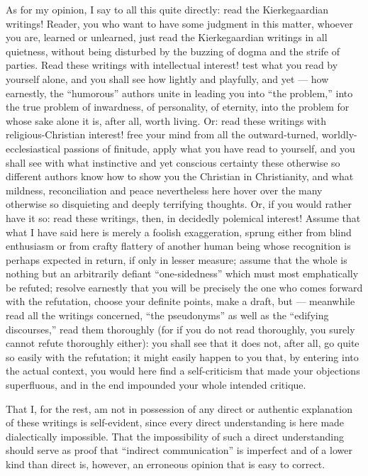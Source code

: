 \documentclass[12pt,a4paper,openany]{book}
\newcommand{\opage}[1]{\marginnote{\footnotesize\textit{[#1]}}}
\begin{document}
As for my opinion, I say to all this
quite directly: read the Kierkegaardian writings! Reader, you
who want to have some judgment in this matter, whoever you are,
learned or unlearned, just read the Kierkegaardian writings in all
quietness, without being disturbed by the buzzing of dogma and the strife
of parties. Read these writings with intellectual interest!
test what you read by yourself alone, and you shall see
how lightly and playfully, and yet --- how earnestly, the ``humorous''
authors unite in leading you into ``the problem,'' into
the true problem of inwardness, of personality, of eternity,
into the problem for whose sake alone it is, after all, worth
living. Or: read these writings with religious-Christian
interest! free your mind from all the outward-turned,
worldly-ecclesiastical passions of finitude, apply what you have read to
yourself, and you shall see with what instinctive and yet conscious
certainty these otherwise so different authors know how to show
you the Christian in Christianity, and what mildness, reconciliation
and peace nevertheless here hover over the many otherwise so
disquieting and deeply terrifying thoughts. Or, if you
would rather have it so: read these writings, then, in decidedly polemical
interest! Assume that what I have said here is merely a
foolish exaggeration, sprung either from blind enthusiasm
or from crafty flattery of another human being whose recognition
is perhaps expected in return, if only in lesser
measure; assume that the whole is nothing but an arbitrarily
defiant ``one-sidedness'' which must most emphatically be
\setcounter{footnote}{0}%
\opage{71}refuted; resolve earnestly that you will be precisely the one who
comes forward with the refutation, choose your definite points, make
a draft, but --- meanwhile read all the writings concerned,
``the pseudonyms'' as well as the ``edifying discourses,'' read
them thoroughly (for if you do not read thoroughly, you surely cannot
refute thoroughly either): you shall see that it does not, after all,
go quite so easily with the refutation; it might
easily happen to you that, by entering into the actual
context, you would here find a self-criticism that made your
objections superfluous, and in the end impounded your whole intended
critique.

That I, for the rest, am not in possession of any direct
or authentic explanation of these writings is self-evident,
since every direct understanding is here made dialectically impossible.
That the impossibility of such a direct understanding
should serve as proof that ``indirect communication''
is imperfect and of a lower kind than direct is, however,
an erroneous opinion that is easy to correct.
\end{document}
